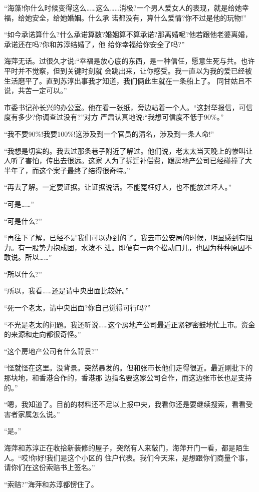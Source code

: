 \documentclass[11pt,a4paper,onecolumn]{article}
\begin{document}
``海藻!你什么时候变得这么……这么……消极?一个男人爱女人的表现，就是给她幸福，给她安全，给她婚姻。什么承
诺都没有，算什么爱情?你不过是他的玩物!''

``如今承诺算什么?什么承诺算数?婚姻算不算承诺?那离婚呢?他若跟他老婆离婚，承诺还在吗?你和苏淳结婚了，他
给你幸福给你安全了吗?''

海萍无话。过很久才说:``幸福是放心底的东西，是一种信任，愿意生死与共。也许平时并不觉察，但到关键时刻就
会跳出来，让你感受。我一直以为我的爱已经被生活磨平了。直到苏淳出事我才知道，我们俩此生就在一条船上了。
同甘姑且不说，共苦一定可以。''

市委书记孙长兴的办公室。他在看一张纸，旁边站着一个人。``这封举报信，可信度有多少?你调查过没有?''对方
严肃认真地说:``我想可信度不低于90\%。''

``我不要90\%!我要100\%!这涉及到一个官员的清名，涉及到一条人命!''

``我想是切实的。我去过那条巷子附近了解过。他们说，老太太当天晚上的惨叫让人听了害怕，传出去很远。这家
人为了拆迁补偿费，跟房地产公司已经碰撞了大半年了，而这个案子最终了结得很奇特。''

``再去了解。一定要证据。让证据说话。不能冤枉好人，也不能放过坏人。''

``可是……''

``可是什么?''

``再往下了解，已经不是我们可以办到的了。我去市公安局的时候，明显感到有阻力。有一股势力抱成团，水泼不
进。即便有一两个松动口儿，也因为种种原因不敢说。所以……''

``所以什么?''

``所以，我看……还是请中央出面比较好。''

``死一个老太，请中央出面?你自己觉得可行吗?''

``不光是老太的问题。我还听说……这个房地产公司最近正紧锣密鼓地忙上市。资金的来源和走向都很奇怪。''

``这个房地产公司有什么背景?''

``怪就怪在这里。没背景。突然暴发的。但和张市长他们走得很近。最近刚批下的那块地，和香港合作的，香港那
边指名要这家公司合作，而这边张市长也是支持的。''

``嗯，我知道了。目前的材料还不足以上报中央，我看你还是要继续搜索，看看受害者家属怎么说。''

``是。''

海萍和苏淳正在收拾新装修的屋子，突然有人来敲门，海萍开门一看，都是陌生人。``哎!你好!我们是这个小区的
住户代表。我们今天来，是想跟你们商量个事，请你们在这份索赔书上签名。''

``索赔?''海萍和苏淳都愣住了。
\end{document}
